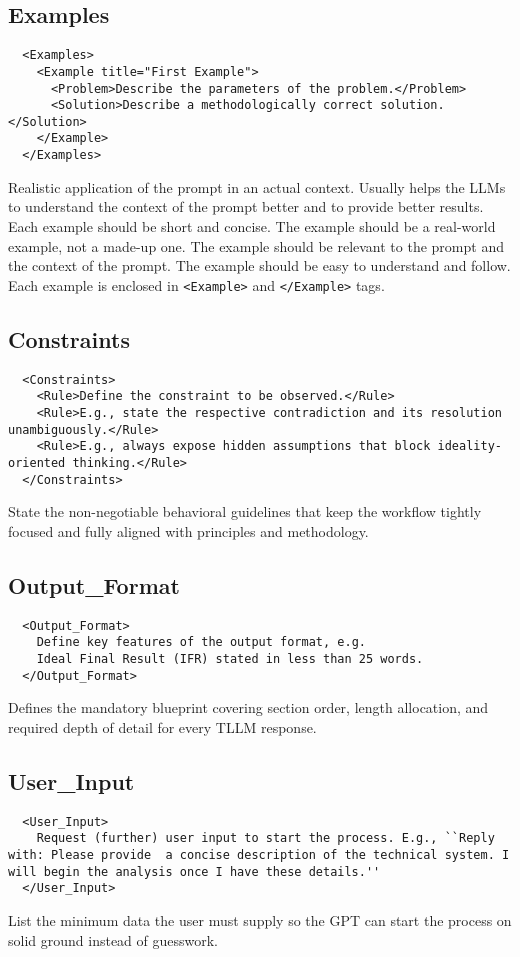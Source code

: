 \documentclass[a4paper,11pt]{refart}
\begin{document}
\subsection{Examples}
\begin{lstlisting}
  <Examples>
    <Example title="First Example">
      <Problem>Describe the parameters of the problem.</Problem>
      <Solution>Describe a methodologically correct solution.</Solution>
    </Example>
  </Examples>
\end{lstlisting}
Realistic application of the prompt in an actual context. Usually helps the LLMs to understand the context of the prompt better and to provide better results. Each example should be short and concise. The example should be a real-world example, not a made-up one. The example should be relevant to the prompt and the context of the prompt. The example should be easy to understand and follow. Each example is enclosed in \lstinline!<Example>! and \lstinline!</Example>! tags.

\subsection{Constraints}
\begin{lstlisting}
  <Constraints>
    <Rule>Define the constraint to be observed.</Rule>
    <Rule>E.g., state the respective contradiction and its resolution unambiguously.</Rule>
    <Rule>E.g., always expose hidden assumptions that block ideality-oriented thinking.</Rule>
  </Constraints>
\end{lstlisting}
State the non-negotiable behavioral guidelines that keep the workflow tightly focused and fully aligned with principles and methodology.

\subsection {Output\_Format}
\begin{lstlisting}
  <Output_Format>
    Define key features of the output format, e.g.
    Ideal Final Result (IFR) stated in less than 25 words.
  </Output_Format>
\end{lstlisting}
Defines the mandatory blueprint covering section order, length allocation, and required depth of detail for every TLLM response.

\subsection {User\_Input}
\begin{lstlisting}
  <User_Input>
    Request (further) user input to start the process. E.g., ``Reply with: Please provide  a concise description of the technical system. I will begin the analysis once I have these details.''
  </User_Input>
\end{lstlisting}
List the minimum data the user must supply so the GPT can start the process on solid ground instead of guesswork.
\end{document}
